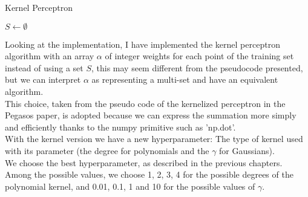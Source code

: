 \begin{algorithm}[H]
    \SetAlgoLined
    \DontPrintSemicolon
    \caption{Kernel Perceptron}
    $S \leftarrow \emptyset$ \\
\end{algorithm}

Looking at the implementation, I have implemented the kernel perceptron algorithm with an array $\alpha$ of integer weights for each point of the training set instead of using a set $S$, this may seem different from the pseudocode presented, but we can interpret $\alpha$ as representing a multi-set and have an equivalent algorithm.\\
This choice, taken from the pseudo code of the kernelized perceptron in the Pegasos paper, is adopted because we can express the summation more simply and efficiently thanks to the numpy primitive such as 'np.dot'.\\

With the kernel version we have a new hyperparameter: The type of kernel used with its parameter (the degree for polynomials and the $\gamma$ for Gaussians).\\
We choose the best hyperparameter, as described in the previous chapters.\\
Among the possible values, we choose 1, 2, 3, 4 for the possible degrees of the polynomial kernel, and 0.01, 0.1, 1 and 10 for the possible values of $\gamma$.\\

